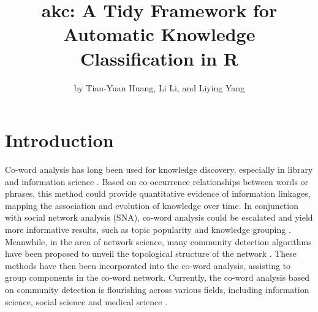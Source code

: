 \title{akc: A Tidy Framework for Automatic Knowledge Classification in
R}
\author{by Tian-Yuan Huang, Li Li, and Liying Yang}

\maketitle


\hypertarget{introduction}{%
\section{Introduction}\label{introduction}}

Co-word analysis has long been used for knowledge discovery, especially
in library and information science \citep{callon1986mapping}. Based on
co-occurrence relationships between words or phrases, this method could
provide quantitative evidence of information linkages, mapping the
association and evolution of knowledge over time. In conjunction with
social network analysis (SNA), co-word analysis could be escalated and
yield more informative results, such as topic popularity
\citep{huang2019measuring} and knowledge grouping
\citep{khasseh2017intellectual}. Meanwhile, in the area of network
science, many community detection algorithms have been proposed to
unveil the topological structure of the network
\citep{Fortunato-627, JavedYounis-626}. These methods have then been
incorporated into the co-word analysis, assisting to group components in
the co-word network. Currently, the co-word analysis based on community
detection is flourishing across various fields, including information
science, social science and medical science
\citep{hu2013co, hu2015research, leung2017bibliometrics, BaziyadShirazi-628}.

